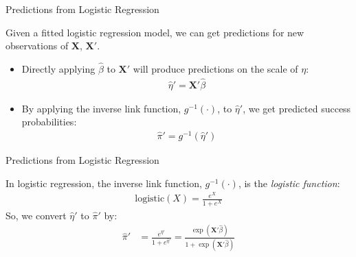 \documentclass{beamer}\usepackage[]{graphicx}\usepackage[]{color}
\begin{document}

\begin{frame}{Predictions from Logistic Regression}
  
  Given a fitted logistic regression model, we can get predictions for new 
  observations of $\mathbf{X}$, $\mathbf{X}'$.
  \vb
  \begin{itemize}
  \item Directly applying $\hat{\beta}$ to $\mathbf{X}'$ will produce 
    predictions on the scale of $\eta$:
    \begin{align*}
      \hat{\eta}' = \mathbf{X}' \hat{\beta}
    \end{align*}
  \item By applying the inverse link function, $g^{-1}(\cdot)$, to $\hat{\eta}'$, 
    we get predicted success probabilities:
    \begin{align*}
      \hat{\pi}' = g^{-1}(\hat{\eta}')
    \end{align*}
  \end{itemize}
  
\end{frame}


\begin{frame}{Predictions from Logistic Regression}
  
  In logistic regression, the inverse link function, $g^{-1}(\cdot)$, is the
  \emph{logistic function}:
  \begin{align*}
    \text{logistic}(X) = \frac{e^X}{1 + e^X}
  \end{align*}
  So, we convert $\hat{\eta}'$ to $\hat{\pi}'$ by:
  \begin{align*}
    \hat{\pi}' &= \frac{e^{\hat{\eta}'}}{1 + e^{\hat{\eta}'}} = 
    \frac{\exp \left( \mathbf{X}' \hat{\beta} \right) }{1 + \exp \left( \mathbf{X}' \hat{\beta} \right) }
  \end{align*}
  
\end{frame}

\end{document}
